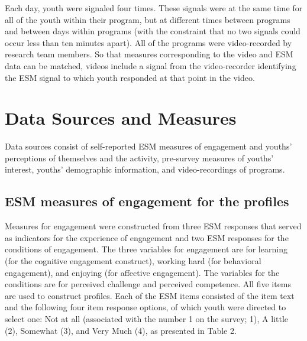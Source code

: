 \documentclass[]{msu-thesis}
\theoremstyle{definition}
\theoremstyle{definition}
\theoremstyle{definition}
\theoremstyle{remark}
\begin{document}
Each day, youth were signaled four times. These signals were at the same
time for all of the youth within their program, but at different times
between programs and between days within programs (with the constraint
that no two signals could occur less than ten minutes apart). All of the
programs were video-recorded by research team members. So that measures
corresponding to the video and ESM data can be matched, videos include a
signal from the video-recorder identifying the ESM signal to which youth
responded at that point in the video.

\section{Data Sources and Measures}\label{data-sources-and-measures}

Data sources consist of self-reported ESM measures of engagement and
youths' perceptions of themselves and the activity, pre-survey measures
of youths' interest, youths' demographic information, and
video-recordings of programs.

\subsection{ESM measures of engagement for the
profiles}\label{esm-measures-of-engagement-for-the-profiles}

Measures for engagement were constructed from three ESM responses that
served as indicators for the experience of engagement and two ESM
responses for the conditions of engagement. The three variables for
engagement are for learning (for the cognitive engagement construct),
working hard (for behavioral engagement), and enjoying (for affective
engagement). The variables for the conditions are for perceived
challenge and perceived competence. All five items are used to construct
profiles. Each of the ESM items consisted of the item text and the
following four item response options, of which youth were directed to
select one: Not at all (associated with the number 1 on the survey; 1),
A little (2), Somewhat (3), and Very Much (4), as presented in Table 2.

\begin{table}

\caption{\label{tab:unnamed-chunk-4}ESM measures for profiles}
\centering
{}
\end{table}
\end{document}
